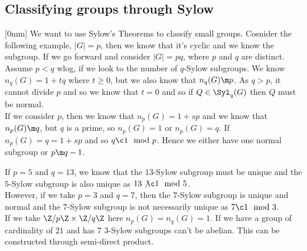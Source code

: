 \subsection{Classifying groups through Sylow}[0mm]
We want to use Sylow's Theorems to classify small groups. Cosnider the following example, $|G| = p$, then we know that it's cyclic and we know the subgroup. If we go forward and consider $|G| = pq$, where $p$ and $q$ are distinct. Assume $p < q$ wlog, if we look to the number of $q$-Sylow subgroups. We know $n_q(G) = 1 + tq$ where $t \ge 0$, but we also know that $n_q(G) \m p$. As $q > p$, it cannot divide $p$ and so we know that $t =0$ and so if $Q \in \Syl_q(G)$ then $Q$ must be normal.\\
If we consider $p$, then we know that $n_p(G) = 1 + sp$ and we know that $n_p(G) \m q$, but $q$ is a prime, so $n_p(G) = 1$ or $n_p(G) = q$. If $n_p(G) = q = 1 +sp$ and so $q \c 1 \mod p$. Hence we either have one normal subgroup or $p \m q - 1$.

\begin{eg}
  If $p = 5$ and $q = 13$, we know that the $13$-Sylow subgroup must be unique and the $5$-Sylow subgroup is also unique as $13 \not\c 1 \mod 5$.\\

  \noindent
  However, if we take $p = 3$ and $q = 7$, then the $7$-Sylow subgroup is unique and normal and the $7$-Sylow subgroup is not necessarily unique as $7 \c 1 \mod 3$.\\

  \noindent
  If we take $\Z/p\Z \times \Z/q\Z$ here $n_p(G) = n_q(G) = 1$. If we have a group of cardinality of $21$ and has 7 $3$-Sylow subgroups can't be abelian. This can be constructed through semi-direct product.
\end{eg}

